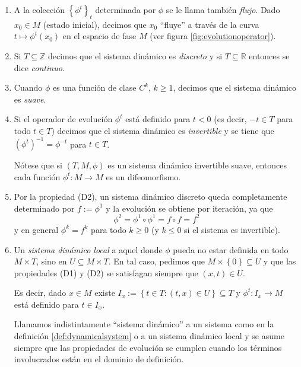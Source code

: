 \documentclass[11pt]{book}
\theoremstyle{definition}
\numberwithin{definition}{section}
\theoremstyle{theorem}
\numberwithin{theorem}{section}
\numberwithin{lemma}{section}
\numberwithin{corollary}{section}
\theoremstyle{plain}
\numberwithin{example}{section}
\newcommand{\Z}{{\ensuremath{\mathbb{Z}}}}
\newcommand{\R}{{\ensuremath{\mathbb{R}}}}
\begin{document}
\begin{enumerate}[-]
  \item A la colecci\'on $\left\{ \phi^t \right\}_t$ determinada por $\phi$ se
  le llama tambi\'en {\emph{flujo}}. Dado $x_0 \in M$ (estado inicial),
  decimos que $x_0$ ``fluye'' a trav\'es de la curva $t \mapsto \phi^t \left(
  x_0 \right)$ en el espacio de fase $M$ (ver figura \ref{fig:evolutionoperator}).

  \item Si $T \subseteq \Z$ decimos que el sistema din\'amico es
  {\emph{discreto}} y si $T \subseteq \R$ entonces se dice
  {\emph{continuo}}.

  \item Cuando $\phi$ es una funci\'on de clase $C^k$, $k \geq 1$,
  decimos que el sistema din\'amico es {\emph{suave}}.

  \item Si el operador de evoluci\'on $\phi^t$ est\'a definido para $t < 0$
  (es decir, $- t \in T$ para todo $t \in T$) decimos que el sistema
  din\'amico es {\emph{invertible}} y se tiene que $\left( \phi^t \right)^{-
  1} = \phi^{- t}$ para $t \in T$.

  N\'otese que si $\left( T, M, \phi \right)$ es un sistema din\'amico
  invertible suave, entonces cada funci\'on $\phi^t : M \rightarrow M$ es un
  difeomorfismo.

  \item Por la propiedad (D2), un sistema din\'amico discreto queda
  completamente determinado por $f := \phi^1$ y la evoluci\'on se obtiene
  por iteraci\'on, ya que
  \[ \phi^2 = \phi^1 \circ \phi^1 = f \circ f = f^2 \]
  y en general $\phi^k = f^k$ para todo $k \geq 0$ (y $k \leq 0$ si
  el sistema es invertible).

  \item Un {\emph{sistema din\'amico local}} a aquel donde $\phi$ pueda no
  estar definida en todo $M \times T$, sino en $U \subseteq M \times T$. En
  tal caso, pedimos que $M \times \left\{ 0 \right\} \subseteq U$ y que las
  propiedades (D1) y (D2) se satisfagan siempre que $\left( x, t \right) \in
  U$.

  Es decir, dado $x \in M$ existe $I_x := \left\{ t \in T : \left( t, x
  \right) \in U \right\} \subseteq T$ y $\phi^t : I_x \rightarrow M$ est\'a
  definido para $t \in I_x$.

  Llamamos indistintamente ``sistema din\'amico'' a un sistema como en la
  definici\'on \ref{def:dynamicalsystem} o a un sistema din\'amico local y se
  asume siempre que las propiedades de evoluci\'on se cumplen cuando los
  t\'erminos involucrados est\'an en el dominio de definici\'on.
\end{enumerate}
\end{document}
